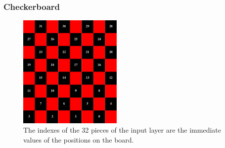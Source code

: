 \documentclass[aspectratio=169]{beamer}
\begin{document}
	\begin{frame}
		\frametitle{Checkerboard}
		\begin{figure}[ht!]
			\centering
			\includegraphics[width=50mm]{checkerboard.png}
			\caption{The indexes of the 32 pieces of the input layer are the immediate values of the positions on the board. \label{overflow}}
		\end{figure}
	\end{frame}
\end{document}
